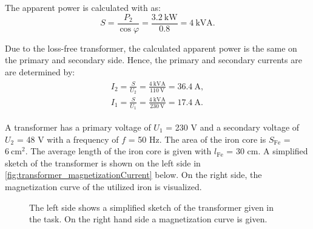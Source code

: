 \begin{solutionblock}
  
  The apparent power is calculated with as:
  \begin{equation}
    S = \frac{P_{\mathrm{2}}}{\cos \varphi}
    = \frac{\SI{3.2}{\kilo \watt}}{0.8}
    = \SI{4}{\kilo\volt\ampere}.
  \end{equation}

  Due to the loss-free transformer, the calculated apparent power is the same on the primary and secondary side. Hence, the primary and secondary currents are are determined by:
  \begin{align}
    \begin{split}
      I_{\mathrm{2}} = \frac{S}{U_{\mathrm{2}}}
      = \frac{\SI{4}{\kilo\volt\ampere}}{\SI{110}{\volt}}
      = \SI{36.4}{\ampere}, \\
      I_{\mathrm{1}} = \frac{S}{U_{\mathrm{1}}}
      = \frac{\SI{4}{\kilo\volt\ampere}}{\SI{230}{\volt}}
      = \SI{17.4}{\ampere}.
    \end{split}
  \end{align}
\end{solutionblock}







A transformer has a primary voltage of $U_{\mathrm{1}}$ = 230 V and a secondary voltage of $U_{\mathrm{2}}$ = 48 V with a frequency of $f$ = 50 Hz. The area of the iron core is $S_{\mathrm{Fe}}$ = $\SI{6}{\centi \metre \squared}$. The average length of the iron core is given with $l_{\mathrm{Fe}}$ = 30 cm. A simplified sketch of the transformer is shown on the left side in \autoref{fig:transformer_magnetizationCurrent} below. On the right side, the magnetization curve of the utilized iron is visualized.

\begin{figure}[htb]
  \centering
  
  \caption{The left side shows a simplified sketch of the transformer given in the task. On the right hand side a magnetization curve is given.}
  \label{fig:transformer_magnetizationCurrent}
\end{figure}




